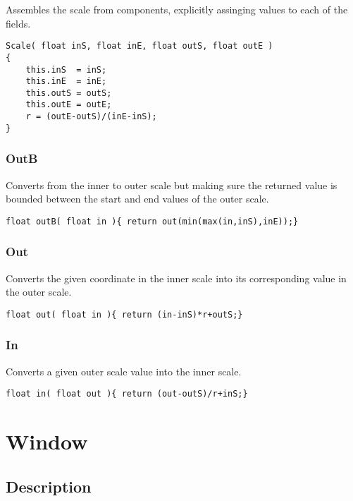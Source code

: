 \documentclass[notitlepage]{article}
\begin{document}
Assembles the scale from components, explicitly assinging values to each of the fields.

\begin{lstlisting}[style=myCpp]
Scale( float inS, float inE, float outS, float outE )
{
	this.inS  = inS;
	this.inE  = inE;
	this.outS = outS;
	this.outE = outE;
	r = (outE-outS)/(inE-inS);
}
\end{lstlisting}

\subsubsection{OutB}

Converts from the inner to outer scale but making sure the returned value is
bounded between the start and end values of the outer scale.

\begin{lstlisting}[style=myCpp]
float outB( float in ){ return out(min(max(in,inS),inE));}
\end{lstlisting}

\subsubsection{Out}

Converts the given coordinate in the inner scale into its corresponding value
in the outer scale.

\begin{lstlisting}[style=myCpp]
float out( float in ){ return (in-inS)*r+outS;} 
\end{lstlisting}

\subsubsection{In}

Converts a given outer scale value into the inner scale.

\begin{lstlisting}[style=myCpp]
float in( float out ){ return (out-outS)/r+inS;}
\end{lstlisting}

\section{Window}

\subsection{Description}
\end{document}
